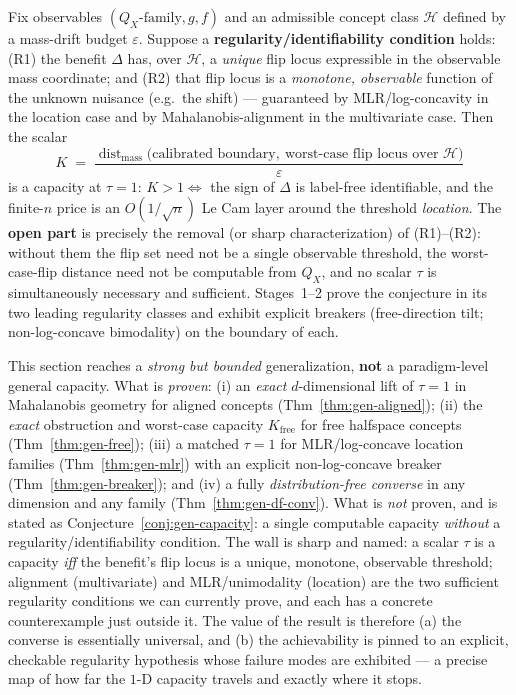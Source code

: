 \begin{conjecture}
\label{conj:gen-capacity}
Fix observables $(Q_X\text{-family},g,f)$ and an admissible concept class $\mathcal H$
defined by a mass-drift budget $\varepsilon$. Suppose a \textbf{regularity/identifiability
condition} holds: \textnormal{(R1)} the benefit $\Delta$ has, over $\mathcal H$, a
\emph{unique} flip locus expressible in the observable mass coordinate; and
\textnormal{(R2)} that flip locus is a \emph{monotone, observable} function of the
unknown nuisance (e.g.\ the shift) --- guaranteed by MLR/log-concavity in the location
case and by Mahalanobis-alignment in the multivariate case. Then the scalar
\[
  K\;=\;\frac{\operatorname{dist}_{\text{mass}}\!\big(\text{calibrated boundary},\ \text{worst-case flip locus over }\mathcal H\big)}{\varepsilon}
\]
is a capacity at $\tau=1$: $K>1\iff$ the sign of $\Delta$ is label-free identifiable,
and the finite-$n$ price is an $O(1/\sqrt n)$ Le Cam layer around the threshold
\emph{location}. The \textbf{open part} is precisely the removal (or sharp
characterization) of \textnormal{(R1)--(R2)}: without them the flip set need not be a
single observable threshold, the worst-case-flip distance need not be computable from
$Q_X$, and no scalar $\tau$ is simultaneously necessary and sufficient. Stages~1--2
prove the conjecture in its two leading regularity classes and exhibit explicit
breakers (free-direction tilt; non-log-concave bimodality) on the boundary of each.
\end{conjecture}

\twocolumn
\begin{remark}\label{rmk:gen-scope}
This section reaches a \emph{strong but bounded} generalization, \textbf{not} a
paradigm-level general capacity. What is \emph{proven}: (i) an \emph{exact}
$d$-dimensional lift of $\tau=1$ in Mahalanobis geometry for aligned concepts
(Thm~\ref{thm:gen-aligned}); (ii) the \emph{exact} obstruction and worst-case capacity
$K_{\mathrm{free}}$ for free halfspace concepts (Thm~\ref{thm:gen-free}); (iii) a
matched $\tau=1$ for MLR/log-concave location families (Thm~\ref{thm:gen-mlr}) with an
explicit non-log-concave breaker (Thm~\ref{thm:gen-breaker}); and (iv) a fully
\emph{distribution-free converse} in any dimension and any family
(Thm~\ref{thm:gen-df-conv}). What is \emph{not} proven, and is stated as
Conjecture~\ref{conj:gen-capacity}: a single computable capacity \emph{without} a
regularity/identifiability condition. The wall is sharp and named: a scalar $\tau$ is a
capacity \emph{iff} the benefit's flip locus is a unique, monotone, observable
threshold; alignment (multivariate) and MLR/unimodality (location) are the two
sufficient regularity conditions we can currently prove, and each has a concrete
counterexample just outside it. The value of the result is therefore (a) the converse
is essentially universal, and (b) the achievability is pinned to an explicit,
checkable regularity hypothesis whose failure modes are exhibited --- a precise map of
how far the $1$-D capacity travels and exactly where it stops.
\end{remark}
